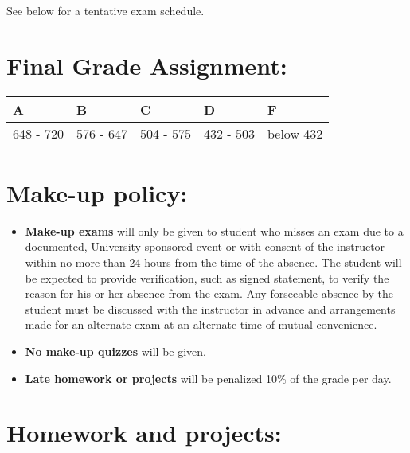 \documentclass[11pt]{article}
\begin{document}
See below for a tentative exam schedule.
\section*{Final Grade Assignment:}
\label{sec-3}


\begin{center}
\begin{tabular}{lllll}
\hline
 A          &  B          &  C          &  D          &  F          \\
\hline
 648 - 720  &  576 - 647  &  504 - 575  &  432 - 503  &  below 432  \\
\hline
\end{tabular}
\end{center}
\section*{Make-up policy:}
\label{sec-4}

\begin{itemize}
\item \textbf{Make-up exams} will only be given to student who misses an exam due to a documented, University sponsored event or with consent of the instructor within no more than 24 hours from the time of the absence. The student will be expected to provide verification, such as signed statement, to verify the reason for his or her absence from the exam. Any forseeable absence by the student must be discussed with the instructor in advance and arrangements made for an alternate exam at an alternate time of mutual convenience.
\item \textbf{No make-up quizzes} will be given.
\item \textbf{Late homework or projects} will be penalized 10\% of the grade per day.
\end{itemize}
\section*{Homework and projects:}
\label{sec-5}
\end{document}

